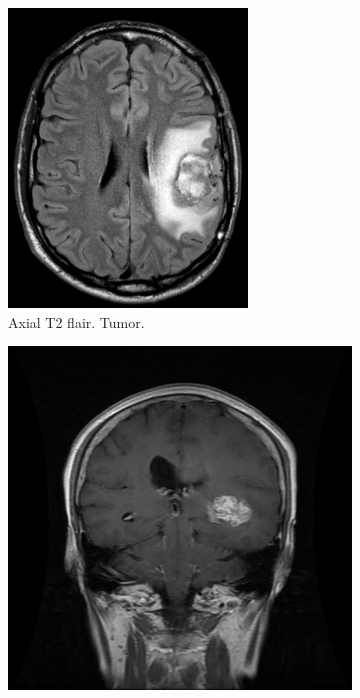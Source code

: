 \begin{figure}[H]
    \begin{subfigure}[b]{0.3\textwidth}
        \centering
        \includegraphics[width=\linewidth]{chapters/deteccion/images/cancer1.png}
        \caption{Axial T2 flair. Tumor.}
        \label{fig:tumor1}
    \end{subfigure}
    \hfill
    \begin{subfigure}[b]{0.3\textwidth}
        \centering
        \includegraphics[width=\linewidth]{chapters/deteccion/images/cancer2.jpg}

\end{subfigure}
\end{figure}
